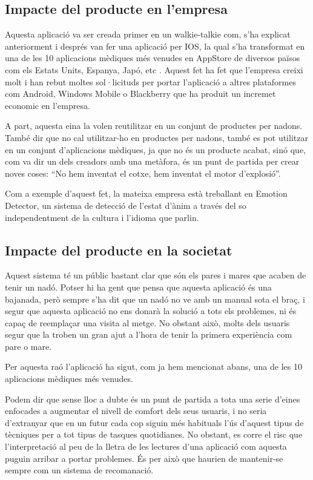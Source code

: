 \documentclass[11pt,a4paper]{article}
\begin{document}
\subsection{\textsf{Impacte del producte en l'empresa}}
\label{impacte-empresa}
Aquesta aplicació va ser creada primer en un walkie-talkie com, s'ha explicat anteriorment i després van fer una aplicació per IOS, la qual s'ha transformat en una de les 10 aplicacions mèdiques més venudes en AppStore de diversos països com els Estats Units, Espanya, Japó, etc \cite{elmundo}. Aquest fet ha fet que l'empresa creixi molt i han rebut moltes sol·licituds per portar l'aplicació a altres plataformes com Android, Windows Mobile o Blackberry que ha produit un incremet economic en l'empresa.

A part, aquesta eina la volen reutilitzar en un conjunt de productes per nadons. També dir que no cal utilitzar-ho en productes per nadons, també es pot utilitzar en un conjunt d'aplicacions mèdiques, ja que no és un producte acabat, sinó que, com va dir un dels creadors amb una metàfora, és un punt de partida per crear noves coses: ``No hem inventat el cotxe, hem inventat el motor d'explosió''.

Com a exemple d'aquest fet, la mateixa empresa està treballant en Emotion Detector, un sistema de detecció de l'estat d'ànim a través del so independentment de la cultura i l'idioma que parlin.

\subsection{\textsf{Impacte del producte en la societat}}
\label{impacte-societat}
Aquest sistema té un públic bastant clar que són els pares i mares que acaben de tenir un nadó. Potser hi ha gent que pensa que aquesta aplicació és una bajanada, però sempre s'ha dit que un nadó no ve amb un manual sota el braç, i segur que aquesta aplicació no ens donarà la solució a tots els problemes, ni és capaç de reemplaçar una visita al metge. No obstant això, molts dels usuaris segur que la troben un gran ajut a l'hora de tenir la primera experiència com pare o mare.

Per aquesta raó l'aplicació ha sigut, com ja hem mencionat abans, una de les 10 aplicacions mèdiques més venudes.

Podem dir que sense lloc a dubte és un punt de partida a tota una serie d'eines enfocades a augmentar el nivell de comfort dels seus usuaris, i no seria d'extranyar que en un futur cada cop siguin més habituals l'ús d'aquest tipus de tècniques per a tot tipus de tasques quotidianes. No obstant, es corre el risc que l'interpretació al peu de la lletra de les lectures d'una aplicació com aquesta puguin arribar a portar problemes. És per això que haurien de mantenir-se sempre com un sistema de recomanació.
\end{document}
